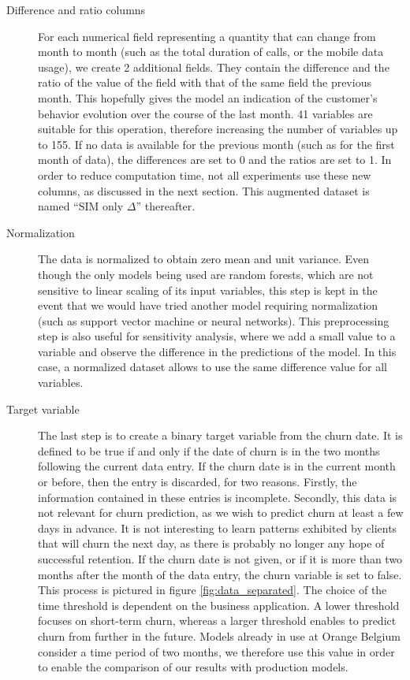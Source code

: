 \begin{description}
	\item[Difference and ratio columns] For each numerical field representing a
	quantity that can change from month to month (such as the total duration of
	calls, or the mobile data usage), we create 2 additional fields. They
	contain the difference and the ratio of the value of the field with that of
	the same field the previous month. This hopefully gives the model an
	indication of the customer's behavior evolution over the course of the last
	month. 41 variables are suitable for this operation, therefore increasing
	the number of variables up to 155. If no data is available for the previous
	month (such as for the first month of data), the differences are set to 0
	and the ratios are set to 1. In order to reduce computation time, not all
	experiments use these new columns, as discussed in the next section. This
    augmented dataset is named ``SIM only $\Delta$'' thereafter.

	\item[Normalization] The data is normalized to obtain zero mean and unit
	variance. Even though the only models being used are random forests, which
	are not sensitive to linear scaling of its input variables, this step is
	kept in the event that we would have tried another model requiring
	normalization (such as support vector machine or neural networks). This
	preprocessing step is also useful for sensitivity analysis, where we add a
	small value to a variable and observe the difference in the predictions of
	the model. In this case, a normalized dataset allows to use the same
	difference value for all variables.

    \item[Target variable] The last step is to create a binary target variable
    from the churn date. It is defined to be true if and only if the date of
    churn is in the two months following the current data entry. If the churn
    date is in the current month or before, then the entry is discarded, for two
    reasons. Firstly, the information contained in these entries is incomplete.
    Secondly, this data is not relevant for churn prediction, as we wish to
    predict churn at least a few days in advance. It is not interesting to learn
    patterns exhibited by clients that will churn the next day, as there is
    probably no longer any hope of successful retention. If the churn date is
    not given, or if it is more than two months after the month of the data
    entry, the churn variable is set to false. This process is pictured in
    figure \ref{fig:data_separated}. The choice of the time threshold is
    dependent on the business application. A lower threshold focuses on
    short-term churn, whereas a larger threshold enables to predict churn from
    further in the future. Models already in use at Orange Belgium consider a
    time period of two months, we therefore use this value in order to enable
    the comparison of our results with production models.

\end{description}


